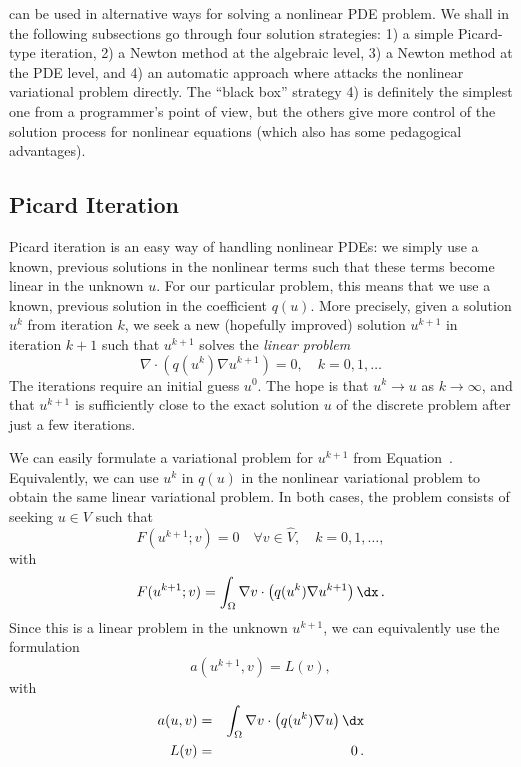 \fenics{} can be used in alternative ways for solving a nonlinear PDE
problem. We shall in the following subsections go through four
solution strategies: 
1) a simple Picard-type iteration, 
2) a Newton method at the algebraic level, 
3) a Newton method at the PDE level, and 
4) an automatic approach where \fenics{} attacks the nonlinear variational
problem directly. The ``black box'' strategy 4) is definitely the 
simplest one from a
programmer's point of view, but the others give more control of the
solution process for nonlinear equations (which also has some
pedagogical advantages).

\subsection{Picard Iteration}
\label{langtangen:nonlinear:Picard}

Picard iteration is an easy way of handling nonlinear PDEs: we simply
use a known, previous solutions in the nonlinear terms such that these
terms become linear in the unknown $u$. 
For our particular problem,
this means that we use a known, previous solution in the coefficient $q(u)$.
More precisely, given a solution $u^k$ from iteration $k$, we seek a
new (hopefully improved) solution $u^{k+1}$ in iteration $k+1$ such
that $u^{k+1}$ solves the \emph{linear problem}
\begin{equation}
\label{langtangen:poisson:nonlinear:picard1}
\nabla\cdot \left(q(u^k)\nabla u^{k+1}\right) = 0,\quad k=0,1,\ldots
\end{equation}
The iterations require an initial guess $u^0$. 
The hope is that $u^{k} \rightarrow u$ as $k\rightarrow\infty$, and that
$u^{k+1}$ is sufficiently close to the exact
solution $u$ of the discrete problem after just a few iterations.

We can easily formulate a variational problem for $u^{k+1}$ from 
Equation~.
Equivalently, we can use $u^k$ in $q(u)$ in
the nonlinear variational problem 
to obtain the same linear variational problem.
In both cases, the problem consists of seeking
$u \in V$ such that
\begin{equation} \label{langtangen:poisson:nonlinear:picard2}
  F(u^{k+1}; v) = 0 \quad \forall v \in \hat{V},\quad k=0,1,\ldots,
\end{equation}
with
\begin{equation}
\label{langtangen:poisson:nonlinear:picard3}
F(u^{k+1}; v) = \int_\Omega \nabla v\cdot\left( q(u^k)\nabla u^{k+1}\right)\dx
\langtangenep
\end{equation}
Since this is a linear problem in the unknown $u^{k+1}$, we can equivalently
use the formulation
\begin{equation}
a(u^{k+1},v) = L(v),
\end{equation}
with 
\begin{eqnarray}
a(u,v) &=& \int_\Omega \nabla v\cdot\left( q(u^k)\nabla u\right)\dx
\\
L(v) &=& 0\langtangenep
\end{eqnarray}

